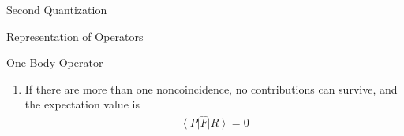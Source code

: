\documentclass[twoside,english]{uiofysmaster}
\begin{document}
\begin{chapter}{Second Quantization}
\begin{section}{Representation of Operators}
\begin{subsection}{One-Body Operator}
\begin{enumerate}
				\begin{align}
					(p = r), \: (s = q), \: ..., \: (n \neq m), \: ..., \: (N = N)
				\end{align}
				We can rewrite the expectation value as
				\begin{align}
					\sum_{pq} f_{pq} \left< 0 \right| \hat a_M ... \hat a_s \hat a_r (\hat a_k^\dagger \hat a_l) \hat a_p^\dagger \hat a_q^\dagger ... \hat a_N^\dagger \left| 0 \right> = (-1)^{\sigma(P)} f_{mn}
				\end{align}
				Because the operators $\hat a_k^\dagger$ and $\hat a_l$ must be paired with the non-identical states $m$ and $n$ for us to be left with a orthogonal inner product.
				\item If there are more than one noncoincidence, no contributions can survive, and the expectation value is 
				\begin{align}
					\left< P \right| \hat F \left| R \right> = 0
				\end{align}
			\end{enumerate}
		\end{subsection}


\end{section}
\end{chapter}
\end{document}
